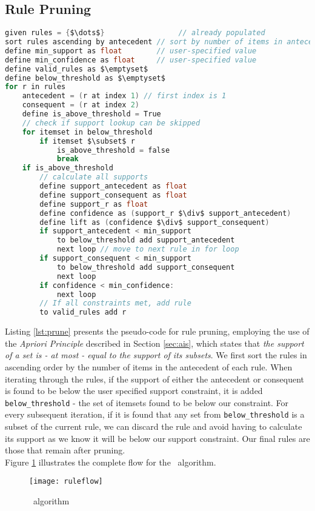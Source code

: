 \subsection{Rule Pruning}
\begin{lstlisting}[language=C, mathescape=true, caption=Rule Pruning, label=lst:prune]
given rules = {$\dots$}                 // already populated
sort rules ascending by antecedent // sort by number of items in antecedent
define min_support as float        // user-specified value
define min_confidence as float     // user-specified value
define valid_rules as $\emptyset$
define below_threshold as $\emptyset$
for r in rules
    antecedent = (r at index 1) // first index is 1
    consequent = (r at index 2)
    define is_above_threshold = True 
    // check if support lookup can be skipped
    for itemset in below_threshold
        if itemset $\subset$ r
            is_above_threshold = false
            break
    if is_above_threshold
        // calculate all supports
        define support_antecedent as float
        define support_consequent as float
        define support_r as float 
        define confidence as (support_r $\div$ support_antecedent)
        define lift as (confidence $\div$ support_consequent)
        if support_antecedent < min_support
            to below_threshold add support_antecedent
            next loop // move to next rule in for loop
        if support_consequent < min_support
            to below_threshold add support_consequent
            next loop
        if confidence < min_confidence:
            next loop
        // If all constraints met, add rule
        to valid_rules add r
\end{lstlisting}
Listing \ref{lst:prune} presents the pseudo-code for rule pruning, employing the use of the \textit{Apriori Principle} described in Section \ref{sec:ais}, which states that \textit{the support of a set is - at most - equal to the support of its subsets}. We first sort the rules in ascending order by the number of items in the antecedent of each rule. When iterating through the rules, if the support of either the antecedent or consequent is found to be below the user specified support constraint, it is added \texttt{below\_threshold} - the set of itemsets found to be below our constraint. For every subsequent iteration, if it is found that any set from \texttt{below\_threshold} is a subset of the current rule, we can discard the rule and avoid having to calculate its support as we know it will be below our support constraint. Our final rules are those that remain after pruning.\\
Figure \ref{fig:algorithm_flow} illustrates the complete flow for the \algo\ algorithm.
\begin{figure}[H]
\centering
\texttt{[image: ruleflow]}
\caption{\algo\ algorithm}
\label{fig:algorithm_flow}
\end{figure}

